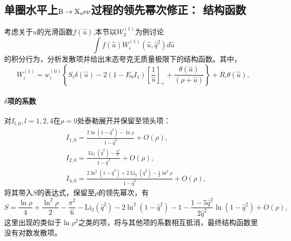 \subsection{单圈水平上$\mathrm{B\to X_{u}e\nu}$过程的领先幂次修正： 结构函数}
考虑关于$\hat{u}$的光滑函数$f(\hat{u})$,本节以$W_{3}^{(1)}$为例讨论
\begin{equation}
    \int f(\hat{u}) W_i^{(1)}\left(\hat{u}, \hat{q}^2\right) d \hat{u}
    \end{equation}
的积分行为，分析发散项并给出末态夸克无质量极限下的结构函数。其中，
\begin{equation}
    W_i^{(1)}=w_i^{(0)}\left\{S_i \delta(\hat{u})-2\left(1-E_0 I_1\right)\left[\frac{1}{\hat{u}}\right]_{+}+\frac{\theta(\hat{u})}{(\rho+\hat{u})}\right\}+R_i \theta(\hat{u}),
    \end{equation}
\paragraph{$\delta$项的系数} 对$I_{l,0},l=1,2,4$在$\rho=0$处泰勒展开并保留至领头项：
\begin{equation}
    \begin{aligned}
    & I_{1,0}=\frac{2 \ln \left(1-\hat{q}^2\right)-\ln \rho}{1-\hat{q}^2}+O(\rho), \\
    & I_{2,0}=\frac{\operatorname{Li}_2\left(\hat{q}^2\right)-\frac{\pi^2}{6}}{1-\hat{q}^2}+O(\rho), \\
    & I_{4,0}=\frac{2 \ln ^2\left(1-\hat{q}^2\right)+2 \operatorname{Li}_2\left(\hat{q}^2\right)-\frac{1}{2} \ln ^2 \rho}{1-\hat{q}^2}+O(\rho),
    \end{aligned}
    \end{equation}
将其带入$S$的表达式，保留至$\rho$的领先幂次，有
\begin{equation}
    S=\frac{\ln \rho}{4}+\frac{\ln ^2 \rho}{2}-\frac{\pi^2}{6}-\mathrm{Li}_2\left(\hat{q}^2\right)-2 \ln ^2\left(1-\hat{q}^2\right)-1-\frac{1-5 \hat{q}^2}{2 \hat{q}^2} \ln \left(1-\hat{q}^2\right)+O(\rho),
    \end{equation}
这里出现的类似于$\ln \rho^2$之类的项，将与其他项的系数相互抵消，最终结构函数里没有对数发散项。
